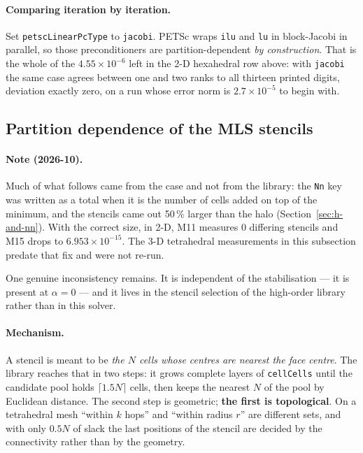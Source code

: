 \documentclass[11pt,a4paper]{article}
\newcommand{\code}[1]{\texttt{\small #1}}
\begin{document}
\paragraph{Comparing iteration by iteration.} Set
\code{petscLinearPcType} to \code{jacobi}. PETSc wraps \code{ilu} and
\code{lu} in block-Jacobi in parallel, so those preconditioners are
partition-dependent \emph{by construction}. That is the whole of the
$4.55\times10^{-6}$ left in the 2-D hexahedral row above: with \code{jacobi}
the same case agrees between one and two ranks to all thirteen printed digits,
deviation exactly zero, on a run whose error norm is $2.7\times10^{-5}$ to
begin with.

\subsection{Partition dependence of the MLS stencils}
\label{sec:dist-stencils}

\paragraph{Note (2026-10).} Much of what follows came from the case and not from
the library: the \code{Nn} key was written as a total when it is the number of
cells added on top of the minimum, and the stencils came out 50\,\% larger than
the halo (Section~\ref{sec:h-and-nn}). With the correct size, in 2-D, M11 measures
0 differing stencils and M15 drops to $6.953\times10^{-15}$. The 3-D tetrahedral
measurements in this subsection predate that fix and were not re-run.

One genuine inconsistency remains. It is independent of the stabilisation --- it
is present at $\alpha=0$ --- and it lives in the stencil selection of the
high-order library rather than in this solver.

\paragraph{Mechanism.} A stencil is meant to be \emph{the $N$ cells whose
centres are nearest the face centre}. The library reaches that in two steps: it
grows complete layers of \code{cellCells} until the candidate pool holds
$\lceil 1.5N\rceil$ cells, then keeps the nearest $N$ of the pool by Euclidean
distance. The second step is geometric; \textbf{the first is topological}. On a
tetrahedral mesh ``within $k$ hops'' and ``within radius $r$'' are different
sets, and with only $0.5N$ of slack the last positions of the stencil are
decided by the connectivity rather than by the geometry.
\end{document}

